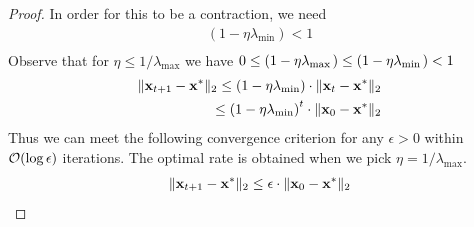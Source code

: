 \begin{proof}
In order for this to be a contraction, we need
\begin{align*}
    (1 - \eta\lambda_{\min{}}) < 1 \\
\end{align*}
Observe that for $\eta \leq 1/\lambda_{\max{}}$ we have $ 0 \leq \left( 1 - \eta \lambda_{\max{}} \right) \leq \left( 1 - \eta \lambda_{\min{}} \right) < 1$
\begin{align*}
    \lVert \mathbf{x}_{t+1} - \mathbf{x}^* \rVert_2 \leq \left(1 - \eta \lambda_{\min} \right) \cdot \lVert \mathbf{x}_t - \mathbf{x}^* \rVert_2 \\
    \leq \left( 1 - \eta \lambda_{\min} \right)^t \cdot \lVert \mathbf{x}_0 - \mathbf{x}^* \rVert_2
\end{align*}
Thus we can meet the following convergence criterion for any $\epsilon > 0$ within $\mathcal{O}(\log \epsilon)$ iterations. The optimal rate is obtained when we pick $\eta = 1/\lambda_{\max}$.
\begin{align*}
    \lVert \mathbf{x}_{t + 1} - \mathbf{x}^* \rVert_2 \leq \epsilon \cdot \lVert \mathbf{x}_0 - \mathbf{x}^* \rVert_2
\end{align*}

    \end{proof}
        
